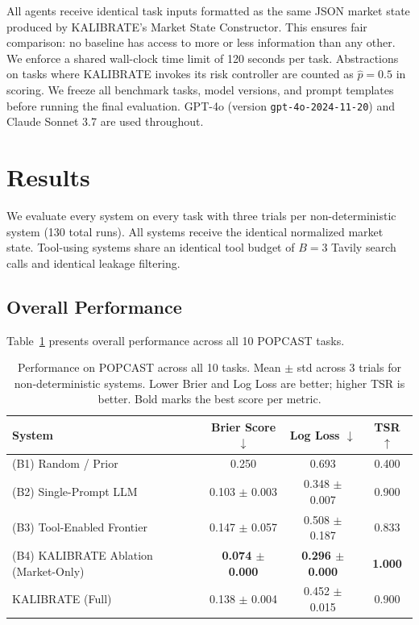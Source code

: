 \documentclass{article} %
\newcommand{\agentname}{KALIBRATE}
\newcommand{\benchmarkname}{POPCAST}
\begin{document}
All agents receive identical task inputs formatted as the same JSON market state produced by \agentname{}'s Market State Constructor. This ensures fair comparison: no baseline has access to more or less information than any other. We enforce a shared wall-clock time limit of 120 seconds per task. Abstractions on tasks where \agentname{} invokes its risk controller are counted as $\hat{p} = 0.5$ in scoring. We freeze all benchmark tasks, model versions, and prompt templates before running the final evaluation. GPT-4o (version \texttt{gpt-4o-2024-11-20}) and Claude Sonnet 3.7 are used throughout.

\section{Results}
\label{sec:results}

We evaluate every system on every task with three trials per non-deterministic system (130 total runs). All systems receive the identical normalized market state. Tool-using systems share an identical tool budget of $B=3$ Tavily search calls and identical leakage filtering.

\subsection{Overall Performance}

Table~\ref{tab:main_results} presents overall performance across all 10 \benchmarkname{} tasks.

\begin{table}[t]
\centering
\caption{Performance on \benchmarkname{} across all 10 tasks. Mean $\pm$ std across 3 trials for non-deterministic systems. Lower Brier and Log Loss are better; higher TSR is better. Bold marks the best score per metric.}
\label{tab:main_results}
\begin{tabular}{lccc}
\toprule
\textbf{System} & \textbf{Brier Score} $\downarrow$ & \textbf{Log Loss} $\downarrow$ & \textbf{TSR} $\uparrow$ \\
\midrule
(B1) Random / Prior         & 0.250                       & 0.693                       & 0.400 \\
(B2) Single-Prompt LLM      & 0.103 $\pm$ 0.003           & 0.348 $\pm$ 0.007           & 0.900 \\
(B3) Tool-Enabled Frontier  & 0.147 $\pm$ 0.057           & 0.508 $\pm$ 0.187           & 0.833 \\
(B4) \agentname{} Ablation (Market-Only) & \textbf{0.074 $\pm$ 0.000}  & \textbf{0.296 $\pm$ 0.000}  & \textbf{1.000} \\
\agentname{} (Full)         & 0.138 $\pm$ 0.004           & 0.452 $\pm$ 0.015           & 0.900 \\
\bottomrule
\end{tabular}
\end{table}
\end{document}

